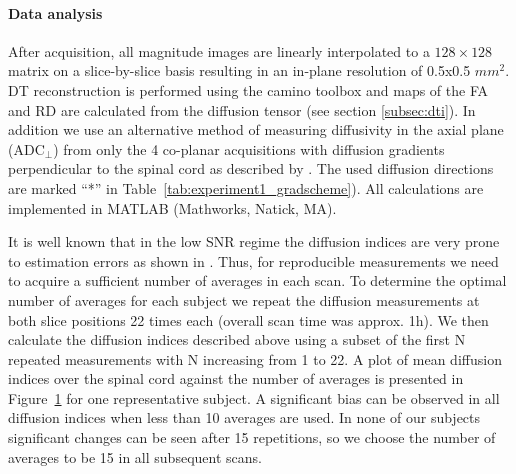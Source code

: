 \paragraph{Data analysis} 
\label{par:data_analysis}
After acquisition, all magnitude images are linearly interpolated to a $128\times128$ matrix on a slice-by-slice basis resulting in an in-plane resolution of 0.5x0.5 $mm^2$. DT reconstruction is performed using the camino toolbox \citep{Cook:2006} and maps of the FA and RD are calculated from the diffusion tensor (see section \ref{subsec:dti}). In addition we use an alternative method of measuring diffusivity in the axial plane (ADC$_\perp$) from only the 4 co-planar acquisitions with diffusion gradients perpendicular to the spinal cord as described by \citet{Fasano:2009}. The used diffusion directions are marked “*” in Table~\ref{tab:experiment1_gradscheme}). All calculations are implemented in MATLAB (Mathworks, Natick, MA).

It is well known that in the low SNR regime the diffusion indices are very prone to estimation errors as shown in \citet{Pierpaoli:1996, Jones:2004,Landman:2008}. Thus, for reproducible measurements we need to acquire a sufficient number of averages in each scan. To determine the optimal number of averages for each subject we repeat the diffusion measurements at both slice positions 22 times each (overall scan time was approx. 1h). We then calculate the diffusion indices described above using a subset of the first N repeated measurements with N increasing from 1 to 22. A plot of mean diffusion indices over the spinal cord against the number of averages is presented in Figure~\ref{fig:plotDTI_averages} for one representative subject. A significant bias can be observed in all diffusion indices when less than 10 averages are used. In none of our subjects significant changes can be seen after 15 repetitions, so we choose the number of averages to be 15 in all subsequent scans.

\begin{figure}
 \centering
  \label{fig:plotDTI_averages}
\end{figure} 

